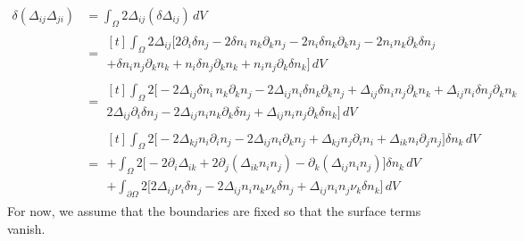\documentclass[reqno]{article}
\begin{document}
\begin{equation}
\begin{split}
    \delta \left( \Delta_{ij} \Delta_{ji} \right)
    &=
    \int_{\Omega}
        2 \Delta_{ij} (\delta \Delta_{ij})
    \, dV \\
    &=
    \begin{multlined}[t]
    \int_{\Omega}
        2 \Delta_{ij} \bigl[
            2 \partial_i \delta n_j
            - 2 \delta n_i \, n_k \partial_k n_j
            - 2 n_i \delta n_k \partial_k n_j
            - 2 n_i n_k \partial_k \delta n_j \\
            + \delta n_i n_j \partial_k n_k
            + n_i \delta n_j \partial_k n_k
            + n_i n_j \partial_k \delta n_k
        \bigr]
    \, dV
    \end{multlined} \\
    &=
    \begin{multlined}[t]
    \int_{\Omega}
        2 \bigl[
            - 2 \Delta_{ij} \delta n_i \, n_k \partial_k n_j
            - 2 \Delta_{ij} n_i \delta n_k \partial_k n_j
            + \Delta_{ij} \delta n_i n_j \partial_k n_k
            + \Delta_{ij} n_i \delta n_j \partial_k n_k \\
            2 \Delta_{ij} \partial_i \delta n_j
            - 2 \Delta_{ij} n_i n_k \partial_k \delta n_j
            + \Delta_{ij} n_i n_j \partial_k \delta n_k
        \bigr]
    \, dV
    \end{multlined} \\
    &=
    \begin{multlined}[t]
    \int_{\Omega}
        2 \bigl[
            - 2 \Delta_{kj} n_i \partial_i n_j
            - 2 \Delta_{ij} n_i \partial_k n_j
            + \Delta_{kj} n_j \partial_i n_i
            + \Delta_{ik} n_i \partial_j n_j
        \bigr] \delta n_k
    \, dV \\
    + \int_{\Omega}
        2 \bigl[
            - 2 \partial_i \Delta_{ik}
            + 2 \partial_j \left(\Delta_{ik} n_i n_j \right)
            - \partial_k \left( \Delta_{ij} n_i n_j \right)
        \bigr] \delta n_k 
    \, dV \\
    + \int_{\partial \Omega}
        2 \bigl[
            2 \Delta_{ij} \nu_i \delta n_j
            - 2 \Delta_{ij} n_i n_k \nu_k \delta n_j
            + \Delta_{ij} n_i n_j \nu_k \delta n_k
        \bigr]
    \, dV
    \end{multlined}
\end{split}
\end{equation}
For now, we assume that the boundaries are fixed so that the surface terms vanish.
\end{document}
